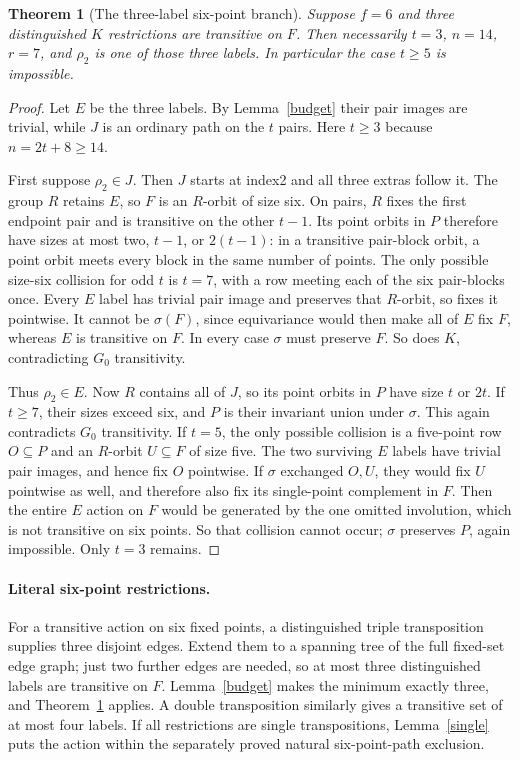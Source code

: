 \documentclass[11pt,a4paper]{article}
\newtheorem{theorem}[lemma]{Theorem}
\begin{document}
\begin{theorem}[The three-label six-point branch]\label{three}
Suppose $f=6$ and three distinguished $K$ restrictions are transitive
on $F$. Then necessarily $t=3$, $n=14$, $r=7$, and $\rho_2$ is one
of those three labels. In particular the case $t\geq5$ is impossible.
\end{theorem}
\begin{proof}
Let $E$ be the three labels. By Lemma~\ref{budget} their pair images
are trivial, while $J$ is an ordinary path on the $t$ pairs.
Here $t\geq3$ because $n=2t+8\geq14$.

First suppose $\rho_2\in J$. Then $J$ starts at index2 and all three
extras follow it. The group $R$ retains $E$, so $F$ is an $R$-orbit
of size six. On pairs, $R$ fixes the first endpoint pair and is
transitive on the other $t-1$. Its point orbits in $P$ therefore have
sizes at most two, $t-1$, or $2(t-1)$: in a transitive pair-block
orbit, a point orbit meets every block in the same number of points.
The only possible size-six collision for odd $t$ is $t=7$, with
a row meeting each of the six pair-blocks once. Every $E$ label has
trivial pair image and preserves that $R$-orbit, so fixes it pointwise.
It cannot be $\sigma(F)$, since equivariance would then make all of
$E$ fix $F$, whereas $E$ is transitive on $F$. In every case $\sigma$
must preserve $F$. So does $K$, contradicting $G_0$ transitivity.

Thus $\rho_2\in E$. Now $R$ contains all of $J$, so its point
orbits in $P$ have size $t$ or $2t$. If $t\geq7$, their sizes
exceed six, and $P$ is their invariant union under $\sigma$.
This again contradicts $G_0$ transitivity. If $t=5$, the only
possible collision is a five-point row $O\subseteq P$ and an
$R$-orbit $U\subseteq F$ of size five. The two surviving $E$
labels have trivial pair images, and hence fix $O$ pointwise.
If $\sigma$ exchanged $O,U$, they would fix $U$ pointwise as well,
and therefore also fix its single-point complement in $F$.
Then the entire $E$ action on $F$ would be generated by the one
omitted involution, which is not transitive on six points.
So that collision cannot occur; $\sigma$ preserves $P$, again
impossible. Only $t=3$ remains.
\end{proof}

\paragraph{Literal six-point restrictions.}
For a transitive action on six fixed points, a distinguished triple
transposition supplies three disjoint edges. Extend them to a spanning
tree of the full fixed-set edge graph; just two further edges are needed,
so at most three distinguished labels are transitive on $F$.
Lemma~\ref{budget} makes the minimum exactly three, and
Theorem~\ref{three} applies. A double transposition similarly gives a
transitive set of at most four labels. If all restrictions are single
transpositions, Lemma~\ref{single} puts the action within the separately
proved natural six-point-path exclusion.
\end{document}
